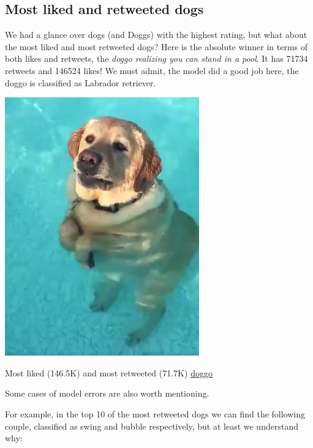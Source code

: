\documentclass{article}
\begin{document}
\subsection{Most liked and retweeted dogs}

We had a glance over dogs (and Doggs) with the highest rating, but what about the most liked and most retweeted dogs? Here is the absolute winner in terms of both likes and retweets, the \textit{doggo realizing you can stand in a pool}. It has 71734 retweets and 146524 likes! We must admit, the model did a good job here, the doggo is classified as Labrador retriever. 

\begin{center}
\includegraphics[scale=0.5]{golden.png}

Most liked (146.5K) and most retweeted (71.7K) \href{https://twitter.com/dog_rates/status/744234799360020481}{doggo}
\end{center}

Some cases of model errors are also  worth mentioning. 

For example, in the top 10 of the most retweeted dogs we can find the following couple, classified as swing and bubble respectively, but at least we understand why:
\end{document}
